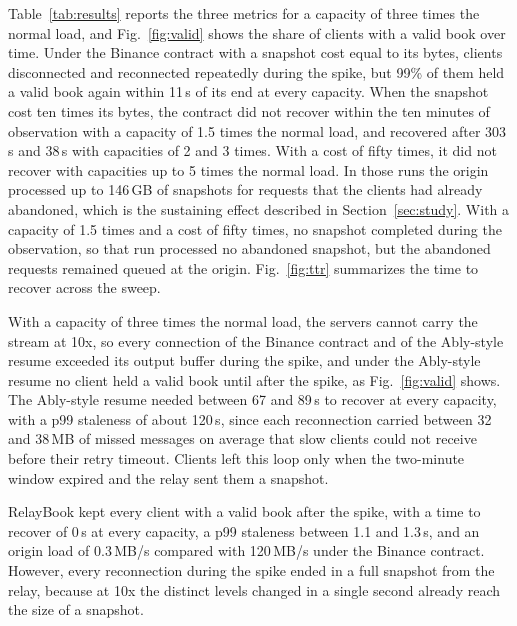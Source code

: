 \documentclass[conference]{IEEEtran}
\begin{document}
Table~\ref{tab:results} reports the three metrics for a capacity of three times the normal load, and Fig.~\ref{fig:valid} shows the share of clients with a valid book over time. Under the Binance contract with a snapshot cost equal to its bytes, clients disconnected and reconnected repeatedly during the spike, but 99\% of them held a valid book again within 11\,s of its end at every capacity. When the snapshot cost ten times its bytes, the contract did not recover within the ten minutes of observation with a capacity of 1.5 times the normal load, and recovered after 303\,s and 38\,s with capacities of 2 and 3 times. With a cost of fifty times, it did not recover with capacities up to 5 times the normal load. In those runs the origin processed up to 146\,GB of snapshots for requests that the clients had already abandoned, which is the sustaining effect described in Section~\ref{sec:study}. With a capacity of 1.5 times and a cost of fifty times, no snapshot completed during the observation, so that run processed no abandoned snapshot, but the abandoned requests remained queued at the origin. Fig.~\ref{fig:ttr} summarizes the time to recover across the sweep.

With a capacity of three times the normal load, the servers cannot carry the stream at 10x, so every connection of the Binance contract and of the Ably-style resume exceeded its output buffer during the spike, and under the Ably-style resume no client held a valid book until after the spike, as Fig.~\ref{fig:valid} shows. The Ably-style resume needed between 67 and 89\,s to recover at every capacity, with a p99 staleness of about 120\,s, since each reconnection carried between 32 and 38\,MB of missed messages on average that slow clients could not receive before their retry timeout. Clients left this loop only when the two-minute window expired and the relay sent them a snapshot.

RelayBook kept every client with a valid book after the spike, with a time to recover of 0\,s at every capacity, a p99 staleness between 1.1 and 1.3\,s, and an origin load of 0.3\,MB/s compared with 120\,MB/s under the Binance contract. However, every reconnection during the spike ended in a full snapshot from the relay, because at 10x the distinct levels changed in a single second already reach the size of a snapshot.
\end{document}
